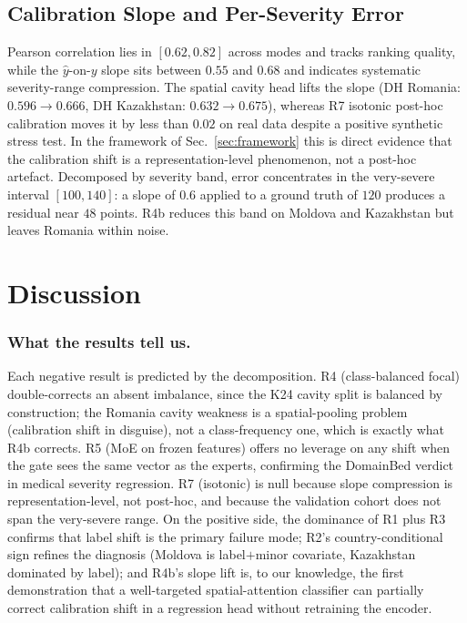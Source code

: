 \documentclass[runningheads]{llncs}
\begin{document}
\subsection{Calibration Slope and Per-Severity Error}
\label{sec:calibration}

Pearson correlation lies in $[0.62,0.82]$ across modes and tracks ranking quality, while the $\hat{y}$-on-$y$ slope sits between $0.55$ and $0.68$ and indicates systematic severity-range compression. The spatial cavity head lifts the slope (DH Romania: $0.596\to 0.666$, DH Kazakhstan: $0.632\to 0.675$), whereas R7 isotonic post-hoc calibration moves it by less than $0.02$ on real data despite a positive synthetic stress test. In the framework of Sec.~\ref{sec:framework} this is direct evidence that the calibration shift is a representation-level phenomenon, not a post-hoc artefact. Decomposed by severity band, error concentrates in the very-severe interval $[100,140]$: a slope of $0.6$ applied to a ground truth of $120$ produces a residual near $48$ points. R4b reduces this band on Moldova and Kazakhstan but leaves Romania within noise.

\section{Discussion}
\label{sec:negatives}

\subsubsection{What the results tell us.}
Each negative result is predicted by the decomposition. R4 (class-balanced focal) double-corrects an absent imbalance, since the K24 cavity split is balanced by construction; the Romania cavity weakness is a spatial-pooling problem (calibration shift in disguise), not a class-frequency one, which is exactly what R4b corrects. R5 (MoE on frozen features) offers no leverage on any shift when the gate sees the same vector as the experts, confirming the DomainBed verdict~\cite{gulrajani2021domainbed} in medical severity regression. R7 (isotonic) is null because slope compression is representation-level, not post-hoc, and because the validation cohort does not span the very-severe range. On the positive side, the dominance of R1 plus R3 confirms that label shift is the primary failure mode; R2's country-conditional sign refines the diagnosis (Moldova is label$+$minor covariate, Kazakhstan dominated by label); and R4b's slope lift is, to our knowledge, the first demonstration that a well-targeted spatial-attention classifier can partially correct calibration shift in a regression head without retraining the encoder.
\end{document}
